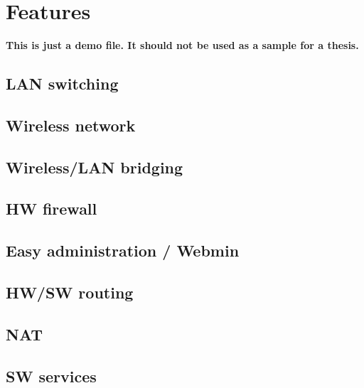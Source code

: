 \chapter{Features}
\label{chapter:features}

\textbf{This is just a demo file. It should not be used as a sample for a thesis.}\\

\section{LAN switching}
\label{sec:lan-switching}

\section{Wireless network}
\label{sec:wireless}

\section{Wireless/LAN bridging}
\label{sec:bridging}

\section{HW firewall}
\label{sec:hw-firewall}

\section{Easy administration / Webmin}
\label{sec:webmin}

\section{HW/SW routing}
\label{sec:routing}

\section{NAT}
\label{sec:nat}

\section{SW services}
\label{sec:sw-services}
